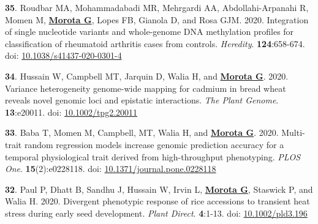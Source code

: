 \documentclass[margin,line,10pt]{res}
\newenvironment{list1}{
  \begin{list}{\ding{113}}{%
      \setlength{\itemsep}{0in}
      \setlength{\parsep}{0in} \setlength{\parskip}{0in}
      \setlength{\topsep}{0in} \setlength{\partopsep}{0in} 
      \setlength{\leftmargin}{0.17in}}}{\end{list}}
\begin{document}
\begin{resume}
\begin{list1}
  \vspace{0.5cm}

\item  [{\bf 35}.] Roudbar MA, Mohammadabadi MR, Mehrgardi AA, Abdollahi-Arpanahi R,  Momen M, \textbf{\underline{Morota G}}, Lopes FB, Gianola D, and Rosa GJM. 2020. Integration of single nucleotide variants and whole-genome DNA methylation profiles for classification of rheumatoid arthritis cases from controls. \emph{Heredity}. \textbf{124}:658-674. doi: \textcolor{blue}{\href{https://doi.org/10.1038/s41437-020-0301-4}{10.1038/s41437-020-0301-4}} 
  
      \vspace{0.5cm}

  \item  [{\bf 34}.]  Hussain W, Campbell MT, Jarquin D, Walia H, and \textbf{\underline{Morota G}}. 2020. Variance heterogeneity genome-wide mapping for cadmium in bread wheat reveals novel genomic loci and epistatic interactions. \emph{The Plant Genome}. \textbf{13}:e20011. doi: \textcolor{blue}{\href{https://doi.org/10.1002/tpg2.20011}{10.1002/tpg2.20011}}

    \vspace{0.5cm}
    
  \item  [{\bf 33}.] Baba T, Momen M, Campbell, MT, Walia H, and \textbf{\underline{Morota G}}. 2020. Multi-trait random regression models increase genomic prediction accuracy for a temporal physiological trait derived from high-throughput phenotyping. \emph{PLOS One}. \textbf{15}(2):e0228118. doi: \textcolor{blue}{\href{https://doi.org/10.1371/journal.pone.0228118}{10.1371/journal.pone.0228118}}
  
  \vspace{0.5cm}

\item [{\bf 32}.] Paul P, Dhatt B, Sandhu J, Hussain W, Irvin L, \textbf{\underline{Morota G}}, Staswick P, and Walia H. 2020. Divergent phenotypic response of rice accessions to transient heat stress during early seed development. \emph{Plant Direct}. \textbf{4}:1-13. doi: \textcolor{blue}{\href{https://doi.org/10.1002/pld3.196}{10.1002/pld3.196}}

  \end{list1}


\section{}
\begin{list1}
  

\end{list1}
\end{resume}
\end{document}
